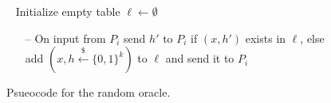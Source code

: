 \begin{figure}
\centering
\begin{minipage}{0.5\textwidth}
\begin{bbox}[title={Functionality $\F_{\m{RO}}$}]
~
Initialize empty table $\ell \leftarrow \emptyset$
\begin{itemize}
\item[--] On input  from $P_i$ send $h'$ to $P_i$ if $(x,h')$ exists in $\ell$, else add $(x, h \xleftarrow{\$}\{0,1\}^k)$ to $\ell$ and send it to $P_i$
\end{itemize}
\end{bbox}
\end{minipage}
\caption{Psueocode for the random oracle.}
\label{fig:fro}
\end{figure}
